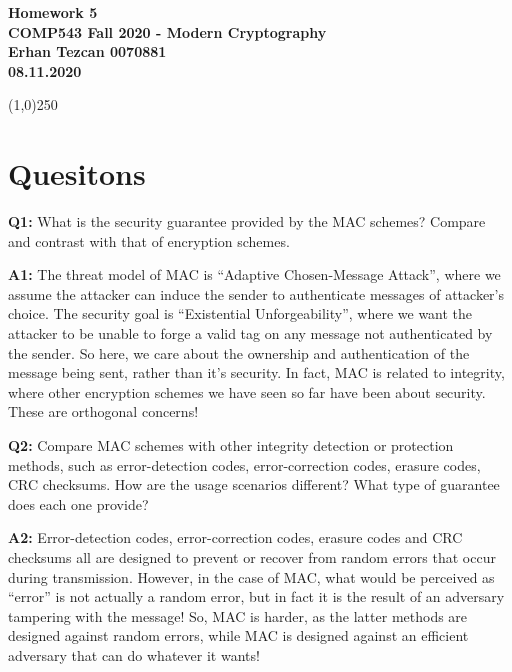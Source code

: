 \documentclass[12pt,reqno]{amsart}
\begin{document}
\begin{center}
\large\textbf{Homework 5 \\ COMP543 Fall 2020 - Modern Cryptography \\}
\normalsize\textbf{ Erhan Tezcan 0070881 \\ 08.11.2020} \\
\end{center}

\begin{center}
\line(1,0){250}
\end{center}

%
%

\section{Quesitons}
\textbf{Q1:} What is the security guarantee provided by the MAC schemes? Compare and contrast with that of encryption schemes.

\textbf{A1:} The threat model of MAC is ``Adaptive Chosen-Message Attack'', where we assume the attacker can induce the sender to authenticate messages of attacker's choice. The security goal is ``Existential Unforgeability'', where we want the attacker to be unable to forge a valid tag on any message not authenticated by the sender. So here, we care about the ownership and authentication of the message being sent, rather than it's security. In fact, MAC is related to integrity, where other encryption schemes we have seen so far have been about security. These are orthogonal concerns!


\vspace{20px}
\textbf{Q2:} Compare MAC schemes with other integrity detection or protection methods, such as error-detection codes, error-correction codes, erasure codes, CRC checksums. How are the usage scenarios different? What type of guarantee does each one provide?

\textbf{A2:} Error-detection codes, error-correction codes, erasure codes and CRC checksums all are designed to prevent or recover from random errors that occur during transmission. However, in the case of MAC, what would be perceived as ``error'' is not actually a random error, but in fact it is the result of an adversary tampering with the message! So, MAC is harder, as the latter methods are designed against random errors, while MAC is designed against an efficient adversary that can do whatever it wants!
\end{document}
